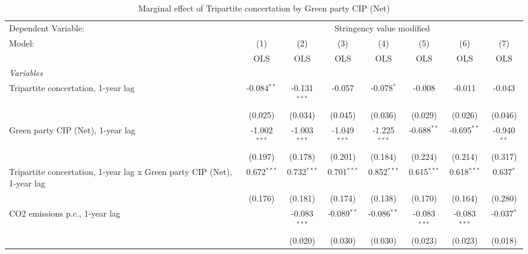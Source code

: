 
\begin{table}[htbp]
   \caption{Marginal effect of Tripartite concertation by Green party CIP (Net)}
   \centering
   \begin{tabular}{lccccccc}
      \toprule
      Dependent Variable: & \multicolumn{7}{c}{Stringency value modified}\\
      Model:                                                                  & (1)            & (2)            & (3)            & (4)            & (5)            & (6)            & (7)\\  
                                                                              &  OLS           & OLS            & OLS            & OLS            & OLS            & OLS            & OLS\\  
      \midrule
      \emph{Variables}\\
      Tripartite concertation, 1-year lag                                     & -0.084$^{**}$  & -0.131$^{***}$ & -0.057         & -0.078$^{*}$   & -0.008         & -0.011         & -0.043\\   
                                                                              & (0.025)        & (0.034)        & (0.045)        & (0.036)        & (0.029)        & (0.026)        & (0.046)\\   
      Green party CIP (Net), 1-year lag                                       & -1.002$^{***}$ & -1.003$^{***}$ & -1.049$^{***}$ & -1.225$^{***}$ & -0.688$^{**}$  & -0.695$^{**}$  & -0.940$^{**}$\\   
                                                                              & (0.197)        & (0.178)        & (0.201)        & (0.184)        & (0.224)        & (0.214)        & (0.317)\\   
      Tripartite concertation, 1-year lag x Green party CIP (Net), 1-year lag & 0.672$^{***}$  & 0.732$^{***}$  & 0.701$^{***}$  & 0.852$^{***}$  & 0.615$^{***}$  & 0.618$^{***}$  & 0.637$^{*}$\\   
                                                                              & (0.176)        & (0.181)        & (0.174)        & (0.138)        & (0.170)        & (0.164)        & (0.280)\\   
      CO2 emissions p.c., 1-year lag                                          &                & -0.083$^{***}$ & -0.089$^{**}$  & -0.086$^{**}$  & -0.083$^{***}$ & -0.083$^{***}$ & -0.037$^{*}$\\   
                                                                              &                & (0.020)        & (0.030)        & (0.030)        & (0.023)        & (0.023)        & (0.018)\\   

\end{tabular}
\end{table}
